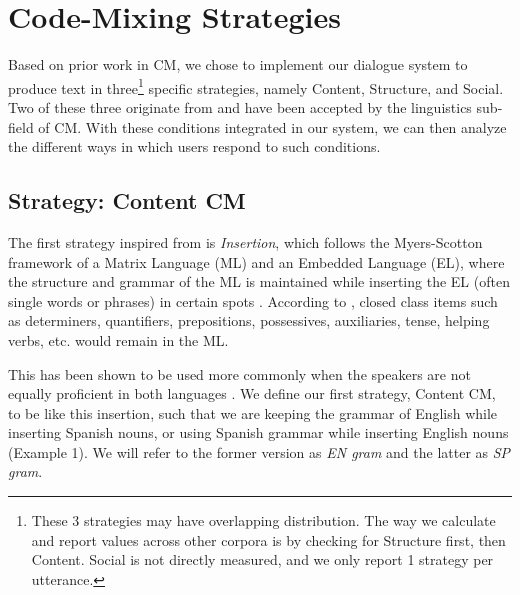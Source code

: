 \documentclass[11pt,a4paper]{article}
\newcommand{\yt}[1]{\textcolor{cyan}{\bf\small [#1 --YT]}}
\begin{document}
\section{Code-Mixing Strategies}
\label{sec:strategies}
Based on prior work in CM, we chose to implement our dialogue system to produce text in three\footnote{These 3 strategies may have overlapping distribution. 
The way we calculate and report values across other corpora is by checking for Structure first, then Content. 
Social is not directly measured, and we only report 1 strategy per utterance.} specific strategies, namely Content, Structure, and Social. 
Two of these three originate from \citet{muysken2000bilingual} and have been accepted by the linguistics sub-field of CM. 
With these conditions integrated in our system, we can then analyze the different ways in which users respond to such conditions.

\subsection{Strategy: Content CM}

The first strategy inspired from \citet{muysken2000bilingual} is \textit{Insertion}, which follows the Myers-Scotton framework of a Matrix Language (ML) and an Embedded Language (EL), where the structure and grammar of the ML is maintained while inserting the EL (often single words or phrases) in certain spots \citep{myers1993common}. 
According to \citet{Joshi1982}, closed class items such as determiners, quantifiers, prepositions, possessives, auxiliaries, tense, helping verbs, etc. would remain in the ML.

This has been shown to be used more commonly when the speakers are not equally proficient in both languages \citep{Deuchar2007}. 
We define our first strategy, Content CM, to be like this insertion, such that we are keeping the grammar of English while inserting Spanish nouns, or using Spanish grammar while inserting English nouns (Example 1). 
We will refer to the former version as \textit{EN gram} and the latter as \textit{SP gram}.
\end{document}
